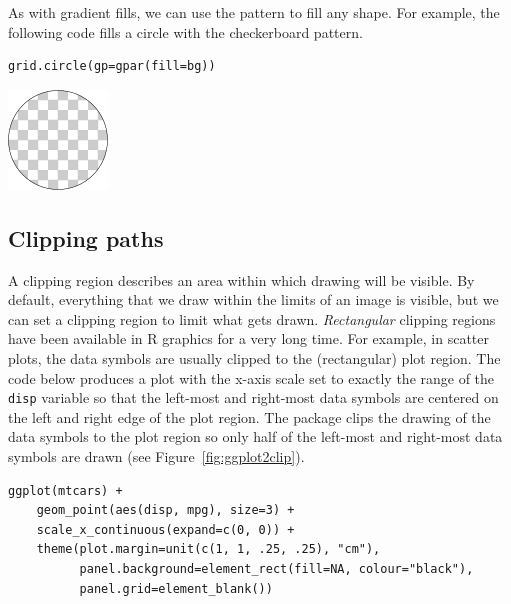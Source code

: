 As with gradient fills, we can use the pattern to fill any shape.
For example, the following code fills a circle with the checkerboard
pattern.

\begin{verbatim}
grid.circle(gp=gpar(fill=bg))  
\end{verbatim}

\includegraphics{murrell-definitions-2023_files/figure-latex/unnamed-chunk-13-1.png}

\hypertarget{clipping-paths}{%
\subsection{Clipping paths}\label{clipping-paths}}

A clipping region describes an area within which drawing will be visible.
By default, everything that we draw within the limits of an image is
visible, but we can set a clipping region to limit what gets drawn.
\emph{Rectangular} clipping regions have been available in R graphics
for a very long time.
For example, in scatter plots, the data symbols are usually
clipped to the (rectangular) plot region. The code below
produces a  plot with
the x-axis scale set to
exactly the range of the \texttt{disp} variable so that the left-most and right-most
data symbols are centered on the left and right edge of the plot region.
The  package clips the drawing of the data symbols to the
plot region so only
half of the left-most and right-most data symbols are drawn
(see Figure~\ref{fig:ggplot2clip}).

\begin{verbatim}
ggplot(mtcars) +
    geom_point(aes(disp, mpg), size=3) +
    scale_x_continuous(expand=c(0, 0)) +
    theme(plot.margin=unit(c(1, 1, .25, .25), "cm"),
          panel.background=element_rect(fill=NA, colour="black"),
          panel.grid=element_blank())
\end{verbatim}

